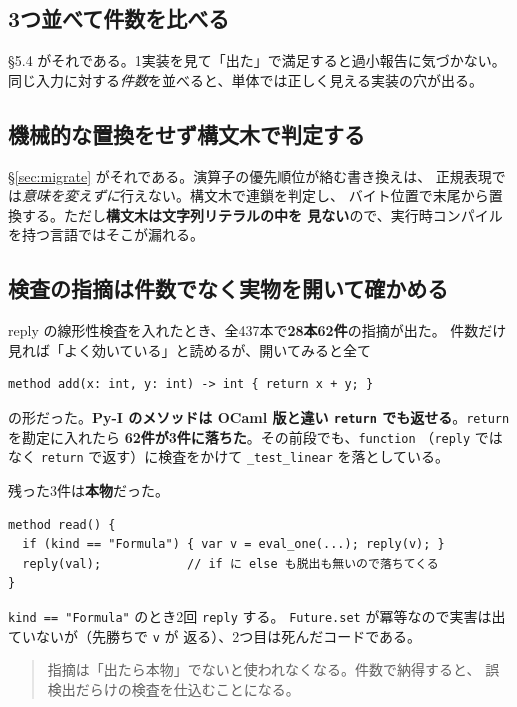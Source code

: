 \documentclass[11pt,a4paper]{ltjsarticle}
\begin{document}
\subsection{3つ並べて件数を比べる}

\S 5.4 がそれである。1実装を見て「出た」で満足すると過小報告に気づかない。
同じ入力に対する\emph{件数}を並べると、単体では正しく見える実装の穴が出る。

\subsection{機械的な置換をせず構文木で判定する}

\S\ref{sec:migrate} がそれである。演算子の優先順位が絡む書き換えは、
正規表現では\emph{意味を変えずに}行えない。構文木で連鎖を判定し、
バイト位置で末尾から置換する。ただし\textbf{構文木は文字列リテラルの中を
見ない}ので、実行時コンパイルを持つ言語ではそこが漏れる。

\subsection{検査の指摘は件数でなく実物を開いて確かめる}

reply の線形性検査を入れたとき、全437本で\textbf{28本62件}の指摘が出た。
件数だけ見れば「よく効いている」と読めるが、開いてみると全て

\begin{lstlisting}[language=AIPL]
method add(x: int, y: int) -> int { return x + y; }
\end{lstlisting}

\noindent の形だった。\textbf{Py-I のメソッドは OCaml 版と違い
\texttt{return} でも返せる}。\texttt{return} を勘定に入れたら
\textbf{62件が3件に落ちた}。その前段でも、\texttt{function}
（\texttt{reply} ではなく \texttt{return} で返す）に検査をかけて
\texttt{\_test\_linear} を落としている。

残った3件は\textbf{本物}だった。

\begin{lstlisting}[language=AIPL]
method read() {
  if (kind == "Formula") { var v = eval_one(...); reply(v); }
  reply(val);            // if に else も脱出も無いので落ちてくる
}
\end{lstlisting}

\noindent \texttt{kind == "Formula"} のとき2回 \texttt{reply} する。
\texttt{Future.set} が冪等なので実害は出ていないが（先勝ちで \texttt{v} が
返る）、2つ目は死んだコードである。

\begin{quote}
\small
指摘は「出たら本物」でないと使われなくなる。件数で納得すると、
誤検出だらけの検査を仕込むことになる。
\end{quote}
\end{document}
